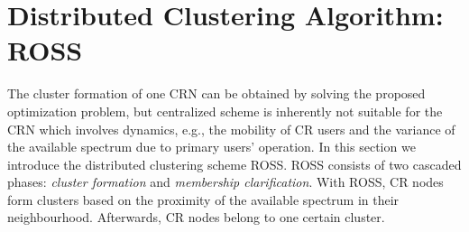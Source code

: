 \documentclass[10pt,journal,compsoc]{IEEEtran}
\theoremstyle{mytheoremstyle}
\theoremstyle{mytheoremstyle}
\theoremstyle{mytheoremstyle}
\newcommand{\eg}{e.g., }
\begin{document}




\section{Distributed Clustering Algorithm: ROSS}
\label{ross}
The cluster formation of one CRN can be obtained by solving the proposed optimization problem, but centralized scheme is inherently not suitable for the CRN which involves dynamics, \eg the mobility of CR users and the variance of the available spectrum due to primary users' operation.
In this section we introduce the distributed clustering scheme ROSS.
%
ROSS consists of two cascaded phases: \textit{cluster formation} and \textit{membership clarification}.
With ROSS, CR nodes form clusters based on the proximity of the available spectrum in their neighbourhood. Afterwards, CR nodes belong to one certain cluster. %
	
\end{document}
